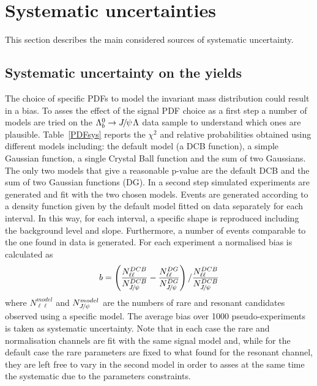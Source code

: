 \section{Systematic uncertainties}
\label{sec:Lb_sys}

This section describes the main considered sources of systematic uncertainty.

\subsection{Systematic uncertainty on the yields}
\label{sec:Lb_yield_sys}

The choice of specific PDFs to model the invariant mass distribution could result
in a bias. To asses the effect of the signal PDF choice as a first step a number of models
are tried on the $\Lb\to\jpsi\Lz$ data sample to understand which ones are plausible.
Table~\ref{PDFsys} reports the $\chi^2$ and relative probabilities obtained using different
models including: the default model (a DCB function), a simple Gaussian function,
a single Crystal Ball function and the sum of two Gaussians. The only two models that
give a reasonable p-value are the default DCB and the sum of two Gaussian functions (DG).
In a second step simulated experiments are generated and fit with the two chosen models.
Events are generated according to a density function given by the default model fitted
on data separately for each \qsq interval. In this way, for each \qsq interval, a specific
shape is reproduced including the background level and slope. Furthermore, a number 
of events comparable to the one found in data is generated. For each experiment a normalised
bias is calculated as
%
\begin{equation}
b = \left(\frac{N^{DCB}_{\ell\ell}}{N^{DCB}_{\jpsi}} - \frac{N^{DG}_{\ell\ell}}{N^{DG}_{\jpsi}}\right) / \frac{N^{DCB}_{\ell\ell}}{N^{DCB}_{\jpsi}}
\end{equation}
%
where $N^{model}_{\ell\ell}$ and $N^{model}_{\jpsi}$ are the numbers of rare and resonant candidates
observed using a specific model. %
The average bias over 1000 pseudo-experiments is taken
as systematic uncertainty. Note that in each case the rare and normalisation channels are fit
with the same signal model and, while for the default case the rare parameters are fixed to what found
for the resonant channel, they are left free to vary in the second model in order to asses
at the same time the systematic due to the parameters constraints.


